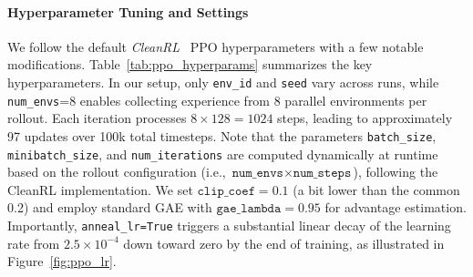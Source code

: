 \paragraph{Hyperparameter Tuning and Settings}
We follow the default \emph{CleanRL}~\cite{huang:cleanrl} PPO hyperparameters with a few notable modifications. Table~\ref{tab:ppo_hyperparams} summarizes the key hyperparameters. In our setup, only \texttt{env\_id} and \texttt{seed} vary across runs, while \texttt{num\_envs}=8 enables collecting experience from 8 parallel environments per rollout. Each iteration processes $8\times128=1024$ steps, leading to approximately 97 updates over 100k total timesteps.
Note that the parameters \texttt{batch\_size}, \texttt{minibatch\_size}, and \texttt{num\_iterations} are computed dynamically at runtime based on the rollout configuration (i.e., \(\texttt{num\_envs} \times \texttt{num\_steps}\)), following the CleanRL implementation.
We set \(\texttt{clip\_coef}=0.1\) (a bit lower than the common 0.2) and employ standard GAE with \(\texttt{gae\_lambda}=0.95\) for advantage estimation. Importantly, \texttt{anneal\_lr=True} triggers a substantial linear decay of the learning rate from $2.5\times10^{-4}$ down toward zero by the end of training, as illustrated in Figure~\ref{fig:ppo_lr}.


